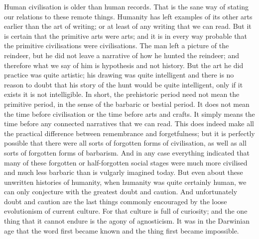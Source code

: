 Human civilisation is older than human records. That is the sane way of stating our relations to these remote things. Humanity has left examples of its other arts earlier than the art of writing; or at least of any writing that we can read. But it is certain that the primitive arts were arts; and it is in every way probable that the primitive civilisations were civilisations. The man left a picture of the reindeer, but he did not leave a narrative of how he hunted the reindeer; and therefore what we say of him is hypothesis and not history. But the art he did practice was quite artistic; his drawing was quite intelligent and there is no reason to doubt that his story of the hunt would be quite intelligent, only if it exists it is not intelligible. In short, the prehistoric period need not mean the primitive period, in the sense of the barbaric or bestial period. It does not mean the time before civilisation or the time before arts and crafts. It simply means the time before any connected narratives that we can read. This does indeed make all the practical difference between remembrance and forgetfulness; but it is perfectly possible that there were all sorts of forgotten forms of civilisation, as well as all sorts of forgotten forms of barbarism. And in any case everything indicated that many of these forgotten or half-forgotten social stages were much more civilised and much less barbaric than is vulgarly imagined today. But even about these unwritten histories of humanity, when humanity was quite certainly human, we can only conjecture with the greatest doubt and caution. And unfortunately doubt and caution are the last things commonly encouraged by the loose evolutionism of current culture. For that culture is full of curiosity; and the one thing that it cannot endure is the agony of agnosticism. It was in the Darwinian age that the word first became known and the thing first became impossible.

